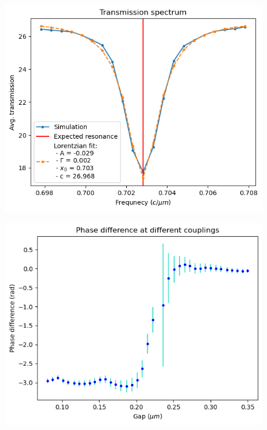 \begin{figure}[H]
    \centering
    \includegraphics[width=0.8\linewidth]{Figures/ring_frequency_sweep.png}
    \caption{}
    \label{fig:ring_frequency_sweep}
\end{figure}

\begin{figure}[H]
    \centering
    \includegraphics[width=0.8\linewidth]{Figures/ring_phase_vs_gap.png}
    \caption{}
    \label{fig:ring_phase_vs_gap}
\end{figure}